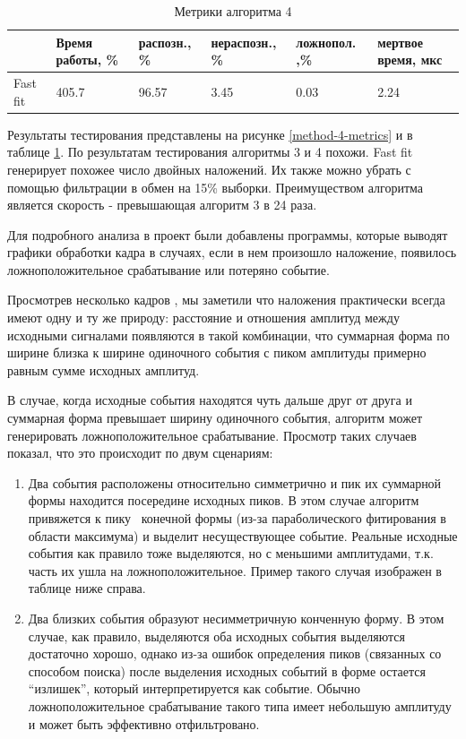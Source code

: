 \documentclass[a4paper,14pt]{extreport}
\begin{document}
\begin{table}
\centering
    \begin{tabular}{|p{}|p{}|p{}|p{}|p{}|p{}|}
        \hline
         & Время работы, \% & распозн., \% & нераспозн., \% & ложнопол. ,\% & мертвое время, мкс \\
        \hline
        Fast fit & 405.7 & 96.57 & 3.45 & 0.03 & 2.24 \\ 
        \hline
    \end{tabular} 
    \caption{Метрики алгоритма 4}
    \label{tbl:methods-compare-2}
\end{table}

Результаты тестирования представлены на рисунке \ref{method-4-metrics} и в таблице \ref{tbl:methods-compare-2}. По результатам тестирования алгоритмы 3 и 4 похожи. Fast fit генерирует похожее число двойных наложений. Их также можно убрать с помощью фильтрации в обмен на 15\% выборки. Преимуществом алгоритма является скорость - превышающая алгоритм 3 в 24 раза.

Для подробного анализа в проект были добавлены программы, которые выводят графики обработки кадра в случаях, если в нем произошло наложение, появилось ложноположительное срабатывание или потеряно событие.

Просмотрев несколько кадров , мы заметили что наложения практически всегда имеют одну и ту же природу: расстояние и отношения амплитуд между исходными сигналами появляются в такой комбинации, что суммарная форма по ширине близка к ширине одиночного события с пиком амплитуды примерно равным сумме исходных амплитуд.

В случае, когда исходные события находятся чуть дальше друг от друга и суммарная форма превышает ширину одиночного события, алгоритм может генерировать ложноположительное срабатывание. Просмотр таких случаев показал, что это происходит по двум сценариям:

\begin{enumerate}
    \item Два события расположены относительно симметрично и пик их суммарной формы находится посередине исходных пиков. В этом случае алгоритм привяжется к пику ~конечной формы (из-за параболического фитирования в области максимума) и выделит несуществующее событие. Реальные исходные события как правило тоже выделяются, но с меньшими амплитудами, т.к. часть их ушла на ложноположительное. Пример такого случая изображен в таблице ниже справа.
    \item Два близких события образуют несимметричную конченную форму. В этом случае, как правило, выделяются оба исходных события выделяются достаточно хорошо, однако из-за ошибок определения пиков (связанных со способом поиска) после выделения исходных событий в форме остается “излишек”, который интерпретируется как событие. Обычно ложноположительное срабатывание такого типа имеет небольшую амплитуду и может быть эффективно отфильтровано.
\end{enumerate}
\end{document}
